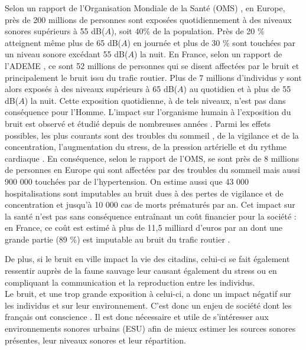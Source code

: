 Selon un rapport de l'Organisation Mondiale de la Santé (OMS) \cite{who_burden_2017}, en Europe, près de 200 millions de personnes sont exposées quotidiennement à des niveaux sonores supérieurs à 55 dB($A$), soit 40$\%$ de la population. Près de 20 $\%$ atteignent même plus de 65 dB($A$) en journée et plus de 30 $\%$ sont touchées par un niveau sonore excédant 55 dB($A$) la nuit. En France, selon un rapport de l'ADEME \cite{europeens2016analyse}, ce sont 52 millions de personnes qui se disent affectées par le bruit et principalement le bruit issu du trafic routier. Plus de 7 millions d'individus y sont alors exposés à des niveaux supérieurs à 65 dB($A$) au quotidien et à plus de 55 dB($A$) la nuit.
Cette exposition quotidienne, à de tels niveaux, n'est pas dans conséquence pour l'Homme. L'impact sur l'organisme humain à l'exposition du bruit est observé et étudié depuis de nombreuses années \cite{ising1980health}. Parmi les effets possibles, les plus courants sont des troubles du sommeil \cite{pirrera2010nocturnal}, de la vigilance et de la concentration, l'augmentation du stress, de la pression artérielle et du rythme cardiaque \cite{babisch2008road, babisch2005traffic}. En conséquence, selon le rapport de l'OMS, se sont près de 8 millions de personnes en Europe qui sont affectées par des troubles du sommeil mais aussi 900 000 touchées par de l'hypertension. On estime aussi que 43 000 hospitalisations sont imputables au bruit dues à des pertes de vigilance et de concentration et jusqu'à 10 000 cas de morts prématurés par an. Cet impact sur la santé n'est pas sans conséquence entraînant un coût financier pour la société : en France, ce coût est estimé à plus de 11,5 milliard d'euros par an dont une grande partie (89 $\%$) est imputable au bruit du trafic routier \cite{europeens2016analyse}. 

De plus, si le bruit en ville impact la vie des citadins, celui-ci se fait également ressentir auprès de la faune sauvage \cite{dutilleux_anthropogenic_2012, francis2009noise} leur causant également du stress ou en compliquant la communication et la reproduction entre les individus.\\

Le bruit, et une trop grande exposition à celui-ci, a donc un impact négatif sur les individus et sur leur environnement. C'est donc un enjeu de société dont les français ont conscience \cite{JNA2016etude}. 
Il est donc nécessaire et utile de s'intéresser aux environnements sonores urbains (ESU) afin de mieux estimer les sources sonores présentes, leur niveaux sonores et leur répartition.

